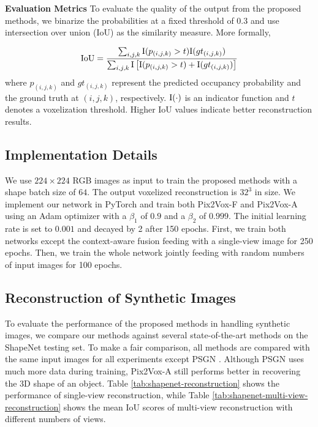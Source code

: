 \documentclass[10pt,twocolumn,letterpaper]{article}
\begin{document}
\noindent \textbf{Evaluation Metrics}
To evaluate the quality of the output from the proposed methods, we binarize the probabilities at a fixed threshold of 0.3 and use intersection over union (IoU) as the similarity measure.
More formally,

\begin{equation}
  {\rm IoU} = \frac{\sum_{i, j, k} {\rm I}(p_{(i, j, k)} > t) {\rm I}(gt_{(i, j, k)})}{\sum_{i, j, k} {\rm I}\left[ {\rm I}(p_{(i, j, k)} > t) + {\rm I}(gt_{(i, j, k)}) \right]}
\end{equation}
where $p_{(i, j, k)}$ and $gt_{(i, j, k)}$ represent the predicted occupancy probability and the ground truth at $(i, j, k)$, respectively.
${\rm I}(\cdot)$ is an indicator function and $t$ denotes a voxelization threshold.
Higher IoU values indicate better reconstruction results.

\subsection{Implementation Details}

We use $224 \times 224$ RGB images as input to train the proposed methods with a shape batch size of $64$.
The output voxelized reconstruction is $32^3$ in size.
We implement our network in PyTorch \cite{DBLP:conf/nips/AdamSSGEZZALA17} and train both Pix2Vox-F and Pix2Vox-A using an Adam optimizer \cite{DBLP:conf/iclr/KingmaB15} with a $\beta_1$ of $0.9$ and a $\beta_2$ of $0.999$.
The initial learning rate is set to $0.001$ and decayed by 2 after 150 epochs.
First, we train both networks except the context-aware fusion feeding with a single-view image for 250 epochs.
Then, we train the whole network jointly feeding with random numbers of input images for 100 epochs.


\subsection{Reconstruction of Synthetic Images}
\label{sec:shapenet-reconstruction}

To evaluate the performance of the proposed methods in handling synthetic images, we compare our methods against several state-of-the-art methods on the ShapeNet testing set.
To make a fair comparison, all methods are compared with the same input images for all experiments except PSGN \cite{DBLP:conf/cvpr/FanSG17}.
Although PSGN uses much more data during training, Pix2Vox-A still performs better in recovering the 3D shape of an object.
Table \ref{tab:shapenet-reconstruction} shows the performance of single-view reconstruction, while Table \ref{tab:shapenet-multi-view-reconstruction} shows the mean IoU scores of multi-view reconstruction with different numbers of views.
\end{document}
